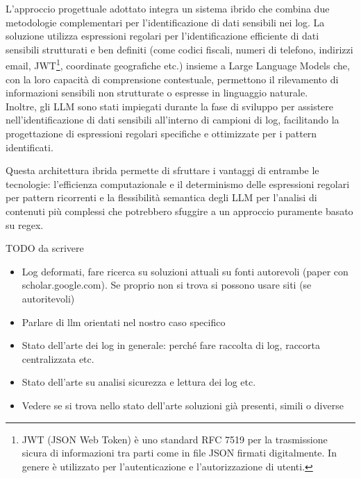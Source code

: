\documentclass[12pt]{report}
\begin{document}
L'approccio progettuale adottato integra un sistema ibrido che combina due metodologie complementari per l'identificazione di dati sensibili nei log. La soluzione utilizza espressioni regolari per l'identificazione efficiente di dati sensibili strutturati e ben definiti (come codici fiscali, numeri di telefono, indirizzi email, JWT\footnote{JWT (JSON Web Token) è uno standard RFC 7519 per la trasmissione sicura di informazioni tra parti come in file JSON firmati digitalmente. In genere è utilizzato per l'autenticazione e l'autorizzazione di utenti.}, coordinate geografiche etc.) insieme a Large Language Models che, con la loro capacità di comprensione contestuale, permettono il rilevamento di informazioni sensibili non strutturate o espresse in linguaggio naturale. \\
Inoltre, gli LLM sono stati impiegati durante la fase di sviluppo per assistere nell'identificazione di dati sensibili all'interno di campioni di log, facilitando la progettazione di espressioni regolari specifiche e ottimizzate per i pattern identificati.

Questa architettura ibrida permette di sfruttare i vantaggi di entrambe le tecnologie: l'efficienza computazionale e il determinismo delle espressioni regolari per pattern ricorrenti e la flessibilità semantica degli LLM per l'analisi di contenuti più complessi che potrebbero sfuggire a un approccio puramente basato su regex.


%
%


TODO da scrivere

\begin{itemize}
    \item Log deformati, fare ricerca su soluzioni attuali su fonti autorevoli (paper con scholar.google.com). Se proprio non si trova si possono usare siti (se autoritevoli)
    \item Parlare di llm orientati nel nostro caso specifico
    \item Stato dell'arte dei log in generale: perché fare raccolta di log, raccorta centralizzata etc.
    \item Stato dell'arte su analisi sicurezza e lettura dei log etc.
    \item Vedere se si trova nello stato dell'arte soluzioni già presenti, simili o diverse
\end{itemize}
\end{document}
